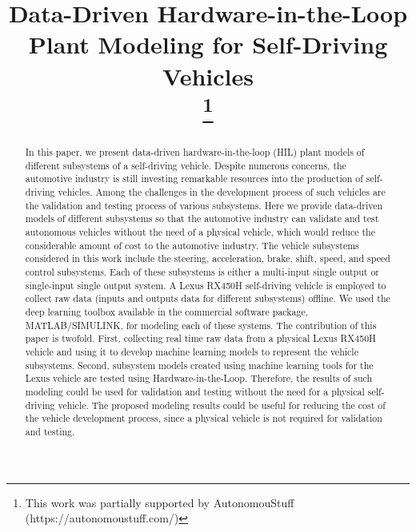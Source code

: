 \documentclass[conference]{IEEEtran}
\begin{document}
\title{Data-Driven Hardware-in-the-Loop Plant Modeling for Self-Driving Vehicles\\
\thanks{This work was partially supported by AutonomouStuff (https://autonomoustuff.com/)}
}


\author{
}

\maketitle

\begin{abstract}

  In this paper, we present data-driven hardware-in-the-loop (HIL) plant models of different subsystems of a self-driving vehicle. Despite numerous concerns, the automotive industry is still investing remarkable resources into the production of self-driving vehicles. Among the challenges in the development process of such vehicles are the validation and testing process of various subsystems. Here we provide data-driven models of different subsystems so that the  automotive industry can validate and test autonomous vehicles without the need of a physical vehicle, which would reduce the considerable amount of cost to the automotive industry. The vehicle subsystems considered in this work include the steering, acceleration, brake, shift, speed, and speed control subsystems. Each of these subsystems is either a multi-input single output or single-input single output system. A Lexus RX450H self-driving vehicle is employed to collect raw data (inputs and outputs data for different subsystems) offline. We used the deep learning toolbox available in the commercial software package, MATLAB/SIMULINK, for modeling each of these systems. The contribution of this paper is twofold. First, collecting real time raw data from a physical Lexus RX450H vehicle and using it to develop machine learning models to represent the vehicle subsystems. Second, subsystem models created using machine learning tools for the Lexus vehicle are tested using Hardware-in-the-Loop. Therefore, the results of such modeling could be used for validation and testing without the need for a physical self-driving vehicle. The proposed modeling results could be useful for reducing the cost of the vehicle development process, since a physical vehicle is not required for validation and testing. 
  

\end{abstract}
\end{document}
